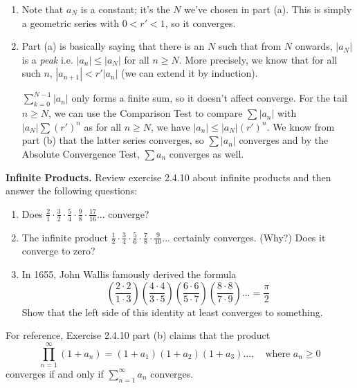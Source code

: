 \documentclass{oxmathproblems}
\begin{document}
\begin{questions}
\begin{solution}
\begin{enumerate}[label=(\alph*)]
    UPDATE: an easier way to think of the formal proof is this. Since $r < r'$, simply choose epsilon that's small enough as to stay below $r'$ e.g. $\epsilon = |r - r'|$, then apply
    the definition of limit.

    \item Note that $a_{N}$ is a constant; it's the $N$ we've chosen in part (a). This is simply a geometric series with $ 0 < r' < 1$, so it converges.
    
    \item Part (a) is basically saying that there is an $N$ such that from $N$ onwards, $|a_{N}|$ is a \textit{peak} i.e. $|a_{n}| \leq |a_{N}|$ for
    all $n \geq N$. More precisely, we know that for all such $n$, $|a_{n+1}| < r'|a_{n}|$ (we can extend it by induction).
    
    $\sum_{k=0}^{N-1} |a_{n}|$ only forms a finite sum, so it doesn't affect converge. For the tail $n \geq N$, we can use the Comparison Test to compare $\sum |a_{n}|$ with $|a_{N}| \sum (r')^{n}$
    as for all $n \geq N$, we have $|a_{n}| \leq |a_{N}|(r')^{n}$. We know from part (b) that the latter series converges, so $\sum |a_{n}|$ converges and by the Absolute Convergence Test,
    $\sum a_{n}$ converges as well. 
  \end{enumerate}
\end{solution}

\miquestion \textbf{Infinite Products.} Review exercise 2.4.10 about infinite products and then answer the following questions:
\begin{enumerate}[label=(\alph*)]
  \item Does $\frac{2}{1} \cdot \frac{3}{2} \cdot \frac{5}{4} \cdot \frac{9}{8} \cdot \frac{17}{16} ...$ converge?
  \item The infinite product $\frac{1}{2} \cdot \frac{3}{4} \cdot \frac{5}{6} \cdot \frac{7}{8} \cdot \frac{9}{10} ...$ certainly converges. (Why?) Does it converge to zero?
  \item In 1655, John Wallis famously derived the formula
  \[\left(\frac{2 \cdot 2}{1 \cdot 3}\right) \left(\frac{4 \cdot 4}{3 \cdot 5}\right) \left(\frac{6 \cdot 6}{5 \cdot 7}\right) \left(\frac{8 \cdot 8}{7 \cdot 9}\right) ... = \frac{\pi}{2}\]
  Show that the left side of this identity at least converges to something.
\end{enumerate}

\begin{solution}
  For reference, Exercise 2.4.10 part (b) claims that the product
  \[\prod_{n=1}^{\infty}(1+a_{n}) = (1+a_{1})(1+a_{2})(1+a_{3})..., \quad \text{where } a_{n} \geq 0\]
  converges if and only if $\sum_{n=1}^{\infty} a_{n}$ converges.


\end{solution}
\end{questions}
\end{document}
